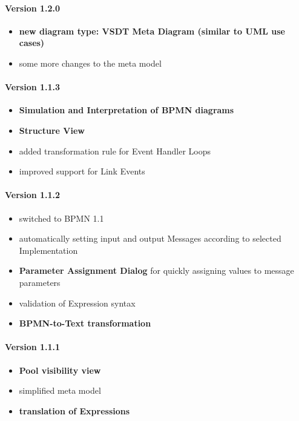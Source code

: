 \paragraph{Version 1.2.0}
\begin{itemize}
	\item \textbf{new diagram type: VSDT Meta Diagram (similar to UML use cases)}
	\item some more changes to the meta model
\end{itemize}

\paragraph{Version 1.1.3}
\begin{itemize}
	\item \textbf{Simulation and Interpretation of BPMN diagrams}
	\item \textbf{Structure View}
	\item added transformation rule for Event Handler Loops
	\item improved support for Link Events
\end{itemize}

\paragraph{Version 1.1.2}
\begin{itemize}
	\item switched to BPMN 1.1
	\item automatically setting input and output Messages according to selected Implementation
	\item \textbf{Parameter Assignment Dialog} for quickly assigning values to message parameters
	\item validation of Expression syntax
	\item \textbf{BPMN-to-Text transformation}
\end{itemize}

\paragraph{Version 1.1.1}
\begin{itemize}
	\item \textbf{Pool visibility view}
	\item simplified meta model
	\item \textbf{translation of Expressions}
\end{itemize}

